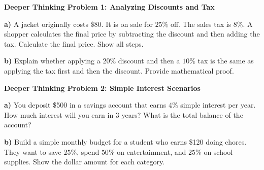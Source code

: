 \documentclass[12pt, letterpaper, fleqn]{article}
\begin{document}
\newpage

\begin{tcolorbox}[colback=white, colframe=black, boxrule=1pt, arc=4mm, left=6mm, right=6mm, top=5mm, bottom=5mm]
\textbf{Deeper Thinking Problem 1: Analyzing Discounts and Tax}

\medskip

\noindent
\textbf{a)} A jacket originally costs \$80. It is on sale for $25\%$ off. The sales tax is $8\%$. A shopper calculates the final price by subtracting the discount and then adding the tax. Calculate the final price. Show all steps.

\vspace{3cm}

\noindent
\textbf{b)} Explain whether applying a $20\%$ discount and then a $10\%$ tax is the same as applying the tax first and then the discount. Provide mathematical proof.

\vspace{3cm}
\end{tcolorbox}

\vspace{3mm}

\begin{tcolorbox}[colback=white, colframe=black, boxrule=1pt, arc=4mm, left=6mm, right=6mm, top=5mm, bottom=5mm]
\textbf{Deeper Thinking Problem 2: Simple Interest Scenarios}

\medskip

\noindent
\textbf{a)} You deposit \$500 in a savings account that earns $4\%$ simple interest per year. How much interest will you earn in 3 years? What is the total balance of the account?

\vspace{3cm}

\noindent
\textbf{b)} Build a simple monthly budget for a student who earns \$120 doing chores. They want to save $25\%$, spend $50\%$ on entertainment, and $25\%$ on school supplies. Show the dollar amount for each category.

\vspace{3cm}
\end{tcolorbox}

\newpage
\end{document}
